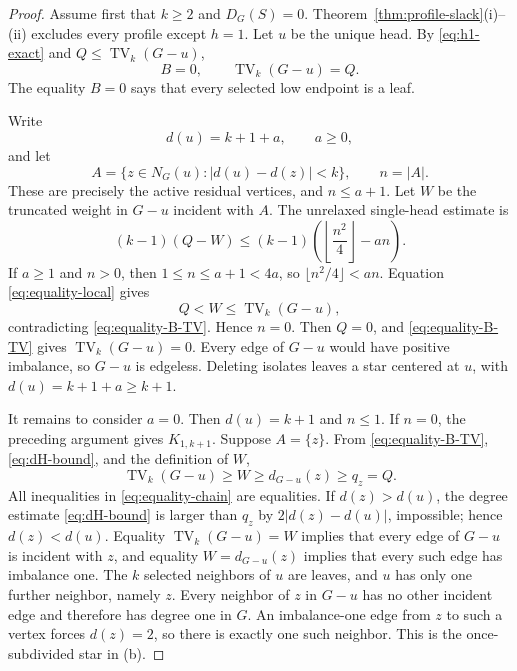 \documentclass[a4paper,11pt]{amsart}
\numberwithin{equation}{section}
\theoremstyle{definition}
\theoremstyle{remark}
\newcommand{\TV}{\operatorname{TV}}
\begin{document}
\begin{proof}
Assume first that $k\ge2$ and $D_G(S)=0$.  Theorem~\ref{thm:profile-slack}(i)--(ii) excludes every profile except $h=1$.  Let $u$ be the unique head.  By \eqref{eq:h1-exact} and $Q\le\TV_k(G-u)$,
\begin{equation}
B=0,
\qquad
\TV_k(G-u)=Q.
\label{eq:equality-B-TV}
\end{equation}
The equality $B=0$ says that every selected low endpoint is a leaf.

Write
\begin{equation}
d(u)=k+1+a,
\qquad a\ge0,
\label{eq:equality-a}
\end{equation}
and let
\[
A=\{z\in N_G(u):\lvert d(u)-d(z)\rvert<k\},
\qquad n=\lvert A\rvert.
\]
These are precisely the active residual vertices, and $n\le a+1$.  Let $W$ be the truncated weight in $G-u$ incident with $A$.  The unrelaxed single-head estimate is
\begin{equation}
(k-1)(Q-W)
\le(k-1)\left(\left\lfloor\frac{n^2}{4}\right\rfloor-an\right).
\label{eq:equality-local}
\end{equation}
If $a\ge1$ and $n>0$, then $1\le n\le a+1<4a$, so $\lfloor n^2/4\rfloor<an$.  Equation \eqref{eq:equality-local} gives
\[
Q<W\le\TV_k(G-u),
\]
contradicting \eqref{eq:equality-B-TV}.  Hence $n=0$.  Then $Q=0$, and \eqref{eq:equality-B-TV} gives $\TV_k(G-u)=0$.  Every edge of $G-u$ would have positive imbalance, so $G-u$ is edgeless.  Deleting isolates leaves a star centered at $u$, with $d(u)=k+1+a\ge k+1$.

It remains to consider $a=0$.  Then $d(u)=k+1$ and $n\le1$.  If $n=0$, the preceding argument gives $K_{1,k+1}$.  Suppose $A=\{z\}$.  From \eqref{eq:equality-B-TV}, \eqref{eq:dH-bound}, and the definition of $W$,
\begin{equation}
\TV_k(G-u)\ge W\ge d_{G-u}(z)\ge q_z=Q.
\label{eq:equality-chain}
\end{equation}
All inequalities in \eqref{eq:equality-chain} are equalities.  If $d(z)>d(u)$, the degree estimate \eqref{eq:dH-bound} is larger than $q_z$ by $2\lvert d(z)-d(u)\rvert$, impossible; hence $d(z)<d(u)$.  Equality $\TV_k(G-u)=W$ implies that every edge of $G-u$ is incident with $z$, and equality $W=d_{G-u}(z)$ implies that every such edge has imbalance one.  The $k$ selected neighbors of $u$ are leaves, and $u$ has only one further neighbor, namely $z$.  Every neighbor of $z$ in $G-u$ has no other incident edge and therefore has degree one in $G$.  An imbalance-one edge from $z$ to such a vertex forces $d(z)=2$, so there is exactly one such neighbor.  This is the once-subdivided star in (b).


\end{proof}
\end{document}
